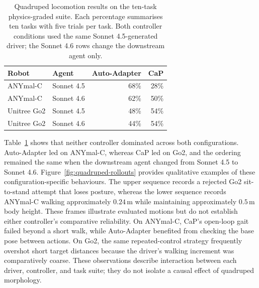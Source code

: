 \begin{table}[htbp]
  \centering
  \small
  \begin{tabular}{llrr}
    \toprule
    \textbf{Robot} & \textbf{Agent} &
    \textbf{Auto-Adapter} & \textbf{CaP} \\
    \midrule
    ANYmal-C & Sonnet 4.5 & 68\% & 28\% \\
    ANYmal-C & Sonnet 4.6 & 62\% & 50\% \\
    Unitree Go2 & Sonnet 4.5 & 48\% & 54\% \\
    Unitree Go2 & Sonnet 4.6 & 44\% & 54\% \\
    \bottomrule
  \end{tabular}
  \caption{Quadruped locomotion results on the ten-task physics-graded
  suite. Each percentage summarises ten tasks with five trials per task.
  Both controller conditions used the same Sonnet 4.5-generated driver;
  the Sonnet 4.6 rows change the downstream agent only.}
  \label{tab:cross-robot-quadruped-locomotion}
\end{table}

Table~\ref{tab:cross-robot-quadruped-locomotion} shows that neither controller
dominated across both configurations. Auto-Adapter led on ANYmal-C, whereas
CaP led on Go2, and the ordering remained the same when the downstream agent
changed from Sonnet 4.5 to Sonnet 4.6.
Figure~\ref{fig:quadruped-rollouts} provides qualitative examples of these
configuration-specific behaviours. The upper sequence records a rejected Go2
sit-to-stand attempt that loses posture, whereas the lower sequence records
ANYmal-C walking approximately $0.24$\,m while maintaining approximately
$0.5$\,m body height. These frames illustrate evaluated motions but do not
establish either controller's comparative reliability. On ANYmal-C, CaP's
open-loop gait failed beyond a short walk, while Auto-Adapter benefited from
checking the base pose between actions. On Go2, the same repeated-control
strategy frequently overshot short target distances because the driver's
walking increment was comparatively coarse. These observations describe
interaction between each driver, controller, and task suite; they do not
isolate a causal effect of quadruped morphology.

